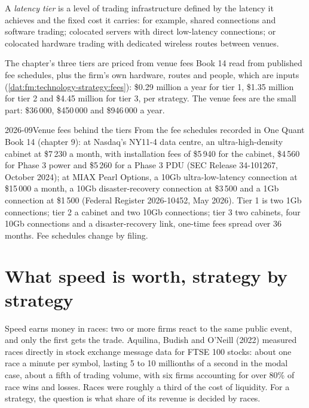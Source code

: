 \begin{definition}\label{def:fm:technology-strategy:tier}
A \emph{latency tier} is a level of trading infrastructure defined by the latency it achieves and the fixed cost it carries:
for example, shared connections and software trading; colocated servers with direct low-latency connections; or colocated hardware trading with
dedicated wireless routes between venues.
\end{definition}

The chapter's three tiers are priced from venue fees Book 14 read from published fee schedules, plus the firm's own hardware, routes and people,
which are inputs (\cref{dat:fm:technology-strategy:fees}): \$0.29 million a year for tier 1, \$1.35 million for tier 2 and \$4.45 million for tier 3,
per strategy. The venue fees are the small part: \$36\,000, \$450\,000 and \$946\,000 a year.

\begin{dated}{2026-09}{Venue fees behind the tiers}\label{dat:fm:technology-strategy:fees}
From the fee schedules recorded in One Quant Book 14 (chapter 9): at Nasdaq's NY11-4 data centre, an ultra-high-density cabinet at \$7\,230 a month,
with installation fees of \$5\,940 for the cabinet, \$4\,560 for Phase 3 power and \$5\,260 for a Phase 3 PDU (SEC Release 34-101267, October
2024); at MIAX Pearl Options, a 10Gb ultra-low-latency connection at \$15\,000 a month, a 10Gb disaster-recovery connection at \$3\,500 and a 1Gb
connection at \$1\,500 (Federal Register 2026-10452, May 2026). Tier 1 is two 1Gb connections; tier 2 a cabinet and two 10Gb connections; tier 3
two cabinets, four 10Gb connections and a disaster-recovery link, one-time fees spread over 36 months. Fee schedules change by filing.
\end{dated}

\section{What speed is worth, strategy by strategy}

Speed earns money in races: two or more firms react to the same public event, and only the first gets the trade. Aquilina, Budish and O'Neill
(2022) measured races directly in stock exchange message data for FTSE 100 stocks: about one race a minute per symbol, lasting 5 to 10
millionths of a second in the modal case, about a fifth of trading volume, with six firms accounting for over 80\% of race wins and losses. Races
were roughly a third of the cost of liquidity. For a strategy, the question is what share of its revenue is decided by races.

